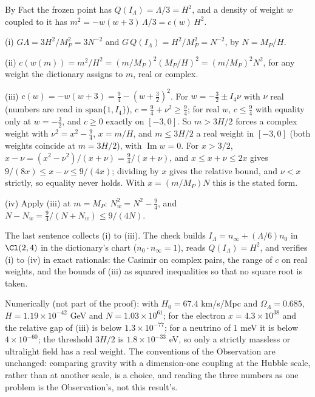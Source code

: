 By Fact  the frozen point has $Q(I_{\Lambda}) = \Lambda/3 = H^{2}$, and a density of weight $w$ coupled to it has $m^{2} = -w(w+3)\,\Lambda/3 = c(w)\,H^{2}$.

(i) $G\Lambda = 3H^{2}/M_{P}^{2} = 3N^{-2}$ and $G\,Q(I_{\Lambda}) = H^{2}/M_{P}^{2} = N^{-2}$, by $N = M_{P}/H$.

(ii) $c(w(m)) = m^{2}/H^{2} = (m/M_{P})^{2}(M_{P}/H)^{2} = (m/M_{P})^{2}N^{2}$, for any weight the dictionary assigns to $m$, real or complex.

(iii) $c(w) = -w(w+3) = \tfrac94 - (w + \tfrac32)^{2}$. For $w = -\tfrac32 \pm I_4\nu$ with $\nu$ real (numbers are read in $\mathrm{span}\{1, I_4\}$), $c = \tfrac94 + \nu^{2} \ge \tfrac94$; for real $w$, $c \le \tfrac94$ with equality only at $w = -\tfrac32$, and $c \ge 0$ exactly on $[-3, 0]$. So $m > 3H/2$ forces a complex weight with $\nu^{2} = x^{2} - \tfrac94$, $x = m/H$, and $m \le 3H/2$ a real weight in $[-3, 0]$ (both weights coincide at $m = 3H/2$), with $\operatorname{Im} w = 0$. For $x > 3/2$, $x - \nu = (x^{2} - \nu^{2})/(x + \nu) = \tfrac94/(x + \nu)$, and $x \le x + \nu \le 2x$ gives $9/(8x) \le x - \nu \le 9/(4x)$; dividing by $x$ gives the relative bound, and $\nu < x$ strictly, so equality never holds. With $x = (m/M_{P})N$ this is the stated form.

(iv) Apply (iii) at $m = M_{P}$: $N_{w}^{2} = N^{2} - \tfrac94$, and $N - N_{w} = \tfrac94/(N + N_{w}) \le 9/(4N)$.

The last sentence collects (i) to (iii). The check builds $I_{\Lambda} = n_{\infty} + (\Lambda/6)n_{0}$ in $\Cl(2,4)$ in the dictionary's chart ($n_{0}\cdot n_{\infty} = 1$), reads $Q(I_{\Lambda}) = H^{2}$, and verifies (i) to (iv) in exact rationals: the Casimir on complex pairs, the range of $c$ on real weights, and the bounds of (iii) as squared inequalities so that no square root is taken.

Numerically (not part of the proof): with $H_{0} = 67.4$ km/s/Mpc and $\Omega_{\Lambda} = 0.685$, $H = 1.19 \times 10^{-42}$ GeV and $N = 1.03 \times 10^{61}$; for the electron $x = 4.3 \times 10^{38}$ and the relative gap of (iii) is below $1.3 \times 10^{-77}$; for a neutrino of $1$ meV it is below $4 \times 10^{-60}$; the threshold $3H/2$ is $1.8 \times 10^{-33}$ eV, so only a strictly massless or ultralight field has a real weight. The conventions of the Observation are unchanged: comparing gravity with a dimension-one coupling at the Hubble scale, rather than at another scale, is a choice, and reading the three numbers as one problem is the Observation's, not this result's.
